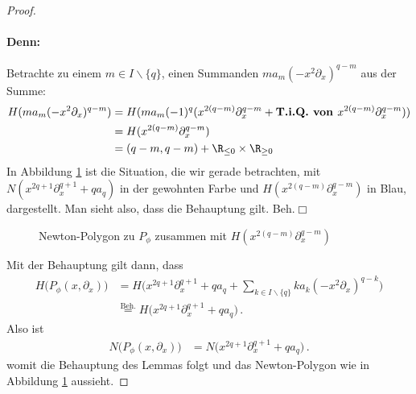 \begin{proof}
\paragraph{Denn:}
Betrachte zu einem $m\in I\backslash \{q\}$, einen Summanden
$ma_m(-x^2\partial_x)^{q-m}$ aus der Summe:
\begin{align*}
H(ma_m(-x^2\partial_x)^{q-m}) &= H(ma_m(-1)^q(x^{2(q-m)}\partial_x^{q-m}
  +\textbf{T.i.Q. von }x^{2(q-m)}\partial_x^{q-m}))
\\&=H(x^{2(q-m)}\partial_x^{q-m})
\\&=(q-m,q-m) + \R_{\leq 0}\times \R_{\geq 0}
\end{align*}
In Abbildung \ref{fig:Newton-PolygonP_phi} ist die Situation, die wir gerade
betrachten, mit $N(x^{2q + 1}\partial_x^{q + 1} + qa_q)$ in der gewohnten Farbe
und $H(x^{2(q-m)}\partial_x^{q-m})$ in Blau, dargestellt.  Man sieht also, dass
die Behauptung gilt.
\hfill Beh.\ensuremath{\Box}

\begin{figure}[htbp] %
\begin{center}
\end{center}
\caption{Newton-Polygon zu $P_{\phi}$ zusammen mit
  $H(x^{2(q-m)}\partial_x^{q-m})$}
\label{fig:Newton-PolygonP_phi}
\end{figure}
Mit der Behauptung gilt dann, dass
\begin{align*}
H\Big(P_{\phi}(x,\partial_x)\Big)
  &= H\Big(x^{2q + 1}\partial_x^{q + 1} + qa_q
  + \sum_{k\in I\backslash\{q\}}k a_k(-x^2\partial_x)^{q-k} \Big)
\\&\!\!\overset{\text{Beh.}}{=} H\Big(x^{2q + 1}\partial_x^{q + 1} + qa_q \Big)
  \,.
\end{align*}
Also ist
\begin{align*}
N\Big(P_{\phi}(x,\partial_x)\Big)
  &= N\Big(x^{2q + 1}\partial_x^{q + 1} + qa_q \Big) \,.
\end{align*}
womit die Behauptung des Lemmas folgt und das Newton-Polygon wie in Abbildung
\ref{fig:Newton-PolygonP_phi} aussieht.
\end{proof}
